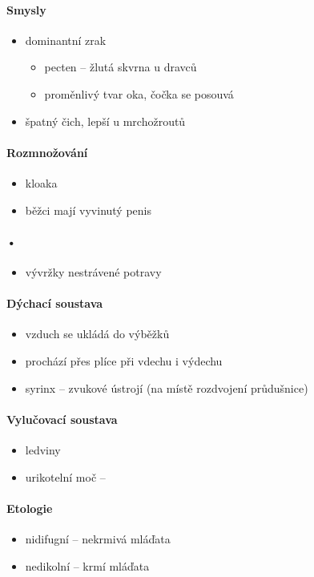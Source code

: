 \paragraph{Smysly}
\begin{itemize}
\item dominantní zrak
	\begin{itemize}
	\item pecten -- žlutá skvrna u dravců
	\item proměnlivý tvar oka, čočka se posouvá
	\end{itemize}
\item špatný čich, lepší u mrchožroutů
\end{itemize}

\paragraph{Rozmnožování}
\begin{itemize}
\item kloaka
\item běžci mají vyvinutý penis
\end{itemize}

\paragraph{•}
\begin{itemize}
\item vývržky nestrávené potravy
\end{itemize}

\paragraph{Dýchací soustava}
\begin{itemize}
\item vzduch se ukládá do výběžků
\item prochází přes plíce při vdechu i výdechu
\item syrinx -- zvukové ústrojí (na místě rozdvojení průdušnice)
\end{itemize}

\paragraph{Vylučovací soustava}
\begin{itemize}
\item ledviny
\item urikotelní moč -- 
\end{itemize}

\paragraph{Etologie}
\begin{itemize}
\item nidifugní -- nekrmivá mláďata
\item nedikolní -- krmí mláďata
\end{itemize}

